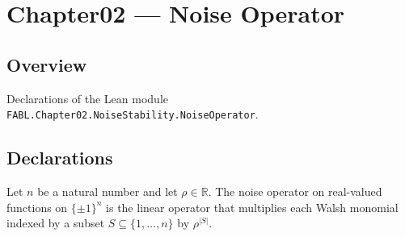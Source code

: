 \chapter{Chapter02 — Noise Operator}
\section{Overview}

Declarations of the Lean module \texttt{FABL.Chapter02.NoiseStability.NoiseOperator}.

\section{Declarations}

\begin{definition}
\label{FABL.noiseOperator}
\leanok
{}
Let $n$ be a natural number and let $\rho\in\mathbb R$. The noise operator on
real-valued functions on $\{\pm1\}^n$ is the linear operator that multiplies each Walsh
monomial indexed by a subset $S\subseteq\{1,\ldots,n\}$ by $\rho^{|S|}$.
\end{definition}

